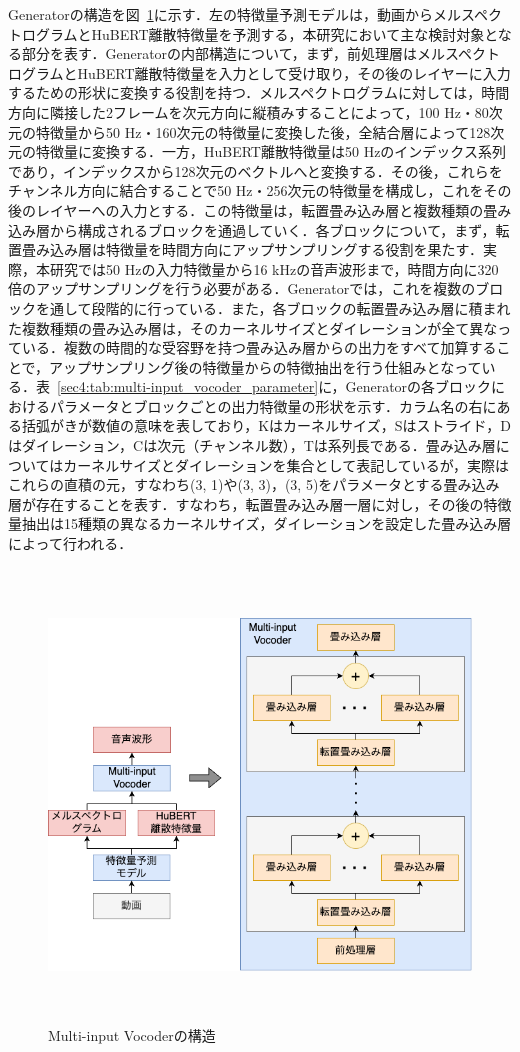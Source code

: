 \documentclass[12pt]{jarticle}
\numberwithin{equation}{section}    %
\numberwithin{figure}{section}      %
\numberwithin{table}{section}      %
\begin{document}
Generatorの構造を図~\ref{sec4:fig:multi-input_vocoder}に示す．左の特徴量予測モデルは，動画からメルスペクトログラムとHuBERT離散特徴量を予測する，本研究において主な検討対象となる部分を表す．Generatorの内部構造について，まず，前処理層はメルスペクトログラムとHuBERT離散特徴量を入力として受け取り，その後のレイヤーに入力するための形状に変換する役割を持つ．メルスペクトログラムに対しては，時間方向に隣接した2フレームを次元方向に縦積みすることによって，100 Hz・80次元の特徴量から50 Hz・160次元の特徴量に変換した後，全結合層によって128次元の特徴量に変換する．一方，HuBERT離散特徴量は50 Hzのインデックス系列であり，インデックスから128次元のベクトルへと変換する．その後，これらをチャンネル方向に結合することで50 Hz・256次元の特徴量を構成し，これをその後のレイヤーへの入力とする．この特徴量は，転置畳み込み層と複数種類の畳み込み層から構成されるブロックを通過していく．各ブロックについて，まず，転置畳み込み層は特徴量を時間方向にアップサンプリングする役割を果たす．実際，本研究では50 Hzの入力特徴量から16 kHzの音声波形まで，時間方向に320倍のアップサンプリングを行う必要がある．Generatorでは，これを複数のブロックを通して段階的に行っている．また，各ブロックの転置畳み込み層に積まれた複数種類の畳み込み層は，そのカーネルサイズとダイレーションが全て異なっている．複数の時間的な受容野を持つ畳み込み層からの出力をすべて加算することで，アップサンプリング後の特徴量からの特徴抽出を行う仕組みとなっている．表~\ref{sec4:tab:multi-input_vocoder_parameter}に，Generatorの各ブロックにおけるパラメータとブロックごとの出力特徴量の形状を示す．カラム名の右にある括弧がきが数値の意味を表しており，Kはカーネルサイズ，Sはストライド，Dはダイレーション，Cは次元（チャンネル数），Tは系列長である．畳み込み層についてはカーネルサイズとダイレーションを集合として表記しているが，実際はこれらの直積の元，すなわち(3, 1)や(3, 3)，(3, 5)をパラメータとする畳み込み層が存在することを表す．すなわち，転置畳み込み層一層に対し，その後の特徴量抽出は15種類の異なるカーネルサイズ，ダイレーションを設定した畳み込み層によって行われる．
\begin{figure}[bt]
    \centering
    \includegraphics[height=120mm]{./figure/sec4/model/multi-input_vocoder.png}
    \caption{Multi-input Vocoderの構造}
    \label{sec4:fig:multi-input_vocoder}
\end{figure}
\end{document}
